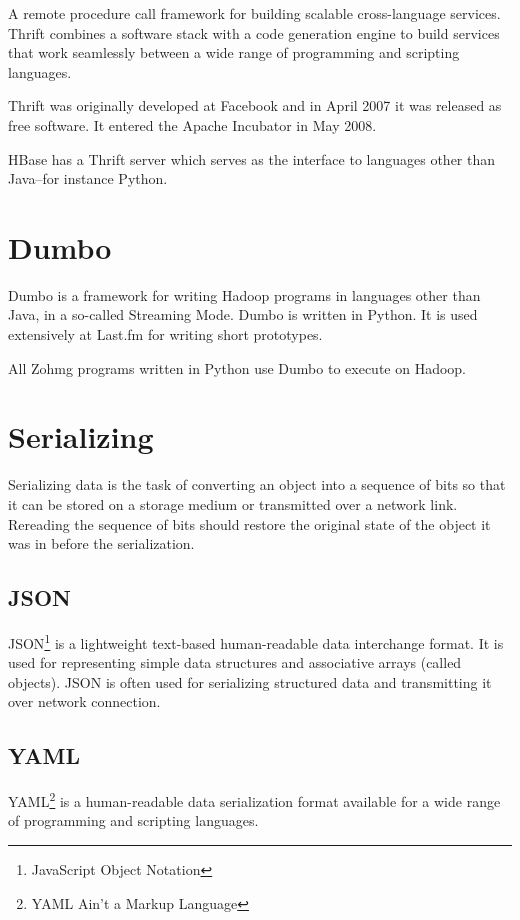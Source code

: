 \documentclass[a4paper,10pt]{book}
\begin{document}
A remote procedure call framework for building scalable cross-language
services. Thrift combines a software stack with a code generation engine to
build services that work seamlessly between a wide range of programming and
scripting languages. \cite{thrift}

Thrift was originally developed at Facebook and in April 2007 it was
released as free software. It entered the Apache Incubator in May 2008.

HBase has a Thrift server which serves as the interface to languages other
than Java--for instance Python.



\section{Dumbo}

Dumbo is a framework for writing Hadoop programs in languages other than
Java, in a so-called Streaming Mode. Dumbo is written in Python. It is used
extensively at Last.fm for writing short prototypes. \cite{dumbo}

All Zohmg programs written in Python use Dumbo to execute on Hadoop.


\section{Serializing}

Serializing data is the task of converting an object into a sequence of
bits so that it can be stored on a storage medium or transmitted over a
network link. Rereading the sequence of bits should restore the original
state of the object it was in before the serialization.


\subsection{JSON}

JSON\footnote{JavaScript Object Notation} is a lightweight text-based
human-readable data interchange format. It is used for representing simple
data structures and associative arrays (called objects). JSON is often used
for serializing structured data and transmitting it over network
connection.


\subsection{YAML}

YAML\footnote{YAML Ain't a Markup Language} is a human-readable data
serialization format available for a wide range of programming and
scripting languages.
\end{document}
